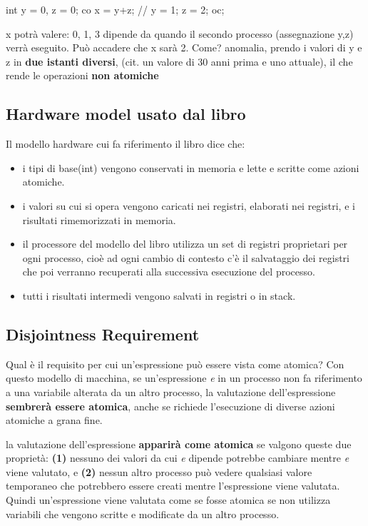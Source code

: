 \documentclass[10pt,a4paper]{book}
\begin{document}
int y = 0, z = 0;
co x = y+z; // y = 1; z = 2; oc;

x potrà valere: 0, 1, 3 dipende da quando il secondo processo (assegnazione y,z) verrà eseguito. Può accadere che x sarà 2. Come? anomalia, prendo i valori di y e z in \textbf{due istanti diversi}, (cit. un valore di 30 anni prima e uno attuale), il che rende le operazioni \textbf{non atomiche}

\subsection{Hardware model usato dal libro}
Il modello hardware cui fa riferimento il libro dice che:
\begin{itemize}
\item i tipi di base(int) vengono conservati in memoria e lette e scritte come azioni atomiche.
\item i valori su cui si opera vengono caricati nei registri, elaborati nei registri, e i risultati rimemorizzati in memoria.
\item il processore del modello del libro utilizza un set di registri proprietari per ogni processo, cioè ad ogni cambio di contesto c'è il salvataggio dei registri che poi verranno recuperati alla successiva esecuzione del processo.
\item tutti i risultati intermedi vengono salvati in registri o in stack.
\end{itemize}

\subsection{Disjointness Requirement}
Qual è il requisito per cui un'espressione può essere vista come atomica?
Con questo modello di macchina, se un'espressione \textit{e} in un processo non fa riferimento a una
variabile alterata da un altro processo, la valutazione dell'espressione \textbf{sembrerà essere
atomica}, anche se richiede l'esecuzione di diverse azioni atomiche a grana fine. 

la valutazione dell'espressione \textbf{apparirà come atomica} se valgono queste due proprietà: \textbf{(1)} nessuno dei valori da cui \textit{e} dipende potrebbe cambiare mentre
\textit{e} viene valutato, e \textbf{(2)} nessun altro processo può vedere qualsiasi valore temporaneo che
potrebbero essere creati mentre l'espressione viene valutata. 
Quindi un'espressione viene valutata come se fosse atomica se non utilizza variabili che vengono scritte e modificate da un altro processo.
\end{document}
